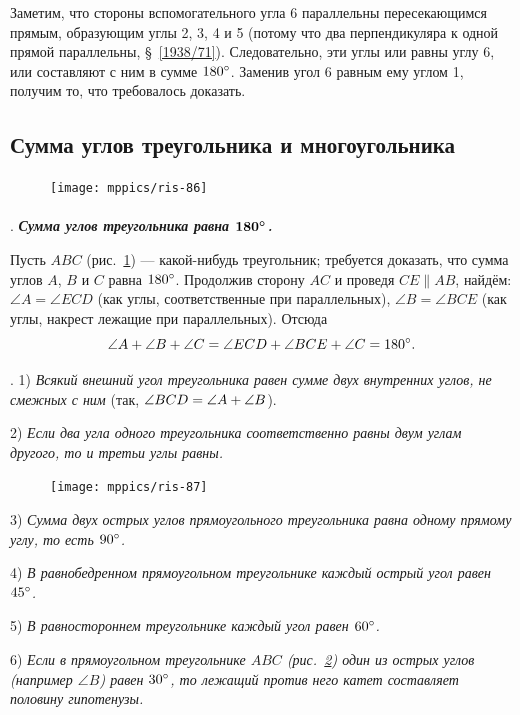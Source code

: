Заметим, что стороны вспомогательного угла 6 параллельны пересекающимся прямым, образующим углы 2, 3, 4 и 5 (потому что два перпендикуляра к одной прямой параллельны, §~\ref{1938/71}). 
Следовательно, эти углы или равны углу 6, или составляют с ним в сумме $180\degree$.
Заменив угол 6 равным ему углом 1, получим то, что требовалось доказать.

\subsection*{Сумма углов треугольника и многоугольника}

\begin{figure}
\centering
\texttt{[image: mppics/ris-86]}
\caption{}\label{1938/ris-86}
\end{figure}

\paragraph{}\label{1938/81}
\mbox{.}
\textbf{\emph{Сумма углов треугольника равна $\bm{180\degree}$.}}

Пусть $ABC$ (рис.~\ref{1938/ris-86}) — какой-нибудь треугольник;
требуется доказать, что сумма углов $A$, $B$ и $C$ равна $180\degree$.
Продолжив сторону $AC$ и проведя $CE\parallel AB$, найдём:
$\angle A = \angle ECD$ (как углы, соответственные при параллельных), $\angle B = \angle BCE$ (как углы, накрест лежащие при параллельных). 
Отсюда
\[\angle A + \angle B+\angle C = \angle ECD + \angle BCE + \angle C =180\degree.\]

\smallskip
{}.
1) \emph{Всякий внешний угол треугольника равен сумме двух внутренних углов, не смежных с ним} (так, $\angle BCD \z= \angle A + \angle B$).

2) \emph{Если два угла одного треугольника соответственно равны двум углам другого, то и третьи углы равны.}

{

\begin{figure}
\centering
\texttt{[image: mppics/ris-87]}
\caption{}\label{1938/ris-87}
\end{figure}

3) \emph{Сумма двух острых углов прямоугольного треугольника равна одному прямому углу, то есть $90\degree$.}

4) \emph{В равнобедренном прямоугольном треугольнике каждый острый угол равен $45\degree$.}

5) \emph{В равностороннем треугольнике каждый угол равен $60\degree$.}

6) \emph{Если в прямоугольном треугольнике $ABC$ \emph{(рис.~\ref{1938/ris-87})} один из острых углов \emph{(например $\angle B$)} равен $30\degree$, то лежащий против него катет составляет половину гипотенузы.}

}

